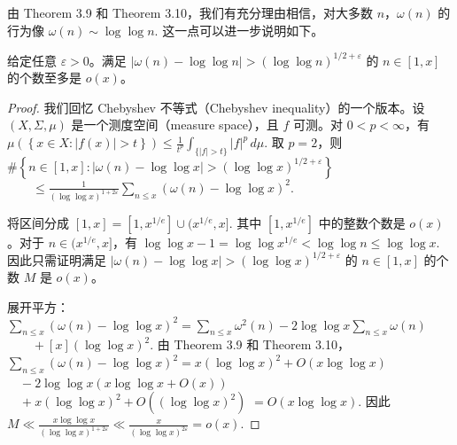 由 Theorem 3.9 和 Theorem 3.10，我们有充分理由相信，对大多数 $n$，$\omega(n)$ 的行为像
\(\textstyle \omega(n)\sim\allowbreak{} \log\log n.\)
这一点可以进一步说明如下。


\begin{theorem}[原文 Theorem 3.11]
	给定任意 $\varepsilon>0$。满足
	\(\textstyle \left|\omega(n)-\log\log n\right| > (\log\log n)^{1/2+\allowbreak{}\varepsilon}\)
	的 $n\in[1,x]$ 的个数至多是 $o(x)$。
\end{theorem}

\begin{proof}
	我们回忆 Chebyshev 不等式（Chebyshev inequality）的一个版本。设 $(X,\Sigma,\mu)$ 是一个测度空间（measure space），且 $f$ 可测。对 $0<p<\infty$，有
	\(\textstyle \mu\left(\left\{x\in X:|f(x)|>t\right\}\right) \leq\allowbreak{} \frac1{t^p}\int_{\{|f|>t\}}|f|^p\,d\mu.\)
	取 $p=2$，则
	\(\textstyle \#\left\{n\in[1,\allowbreak{}x]: \left|\omega(n)-\log\log x\right| > (\log\log x)^{1/2+\allowbreak{}\varepsilon} \right\}\) \(\textstyle \qquad\leq\allowbreak{} \frac1{(\log\log x)^{1+\allowbreak{}2\varepsilon}} \sum_{n\leq\allowbreak{} x}\left(\omega(n)-\log\log x\right)^2.\)

	将区间分成
	\(\textstyle [1,\allowbreak{}x]=\allowbreak{}[1,\allowbreak{}x^{1/e}]\cup (x^{1/e},\allowbreak{}x].\)
	其中 $[1,x^{1/e}]$ 中的整数个数是 $o(x)$。对于 $n\in(x^{1/e},x]$，有
	\(\textstyle \log\log x-1=\allowbreak{}\log\log x^{1/e}<\log\log n\leq\allowbreak{} \log\log x.\)
	因此只需证明满足
	\(\textstyle \left|\omega(n)-\log\log x\right| > (\log\log x)^{1/2+\allowbreak{}\varepsilon}\)
	的 $n\in[1,x]$ 的个数 $M$ 是 $o(x)$。

	展开平方：
	\(\textstyle \sum_{n\leq\allowbreak{} x}\left(\omega(n)-\log\log x\right)^2 =\allowbreak{} \sum_{n\leq\allowbreak{} x}\omega^2(n) - 2\log\log x\sum_{n\leq\allowbreak{} x}\omega(n)\) \(\textstyle \qquad+\allowbreak{} [x](\log\log x)^2.\)
	由 Theorem 3.9 和 Theorem 3.10，
	\(\textstyle \sum_{n\leq\allowbreak{} x}\left(\omega(n)-\log\log x\right)^2 =\allowbreak{} x(\log\log x)^2+\allowbreak{}O(x\log\log x)\) \(\textstyle \quad -2\log\log x\left(x\log\log x+\allowbreak{}O(x)\right)\) \(\textstyle \quad +\allowbreak{}x(\log\log x)^2+\allowbreak{}O\left((\log\log x)^2\right)\) \(\textstyle =\allowbreak{} O(x\log\log x).\)
	因此
	\(\textstyle M \ll\allowbreak{} \frac{x\log\log x}{(\log\log x)^{1+\allowbreak{}2\varepsilon}} \ll\allowbreak{} \frac{x}{(\log\log x)^{2\varepsilon}} =\allowbreak{} o(x).\)
\end{proof}

